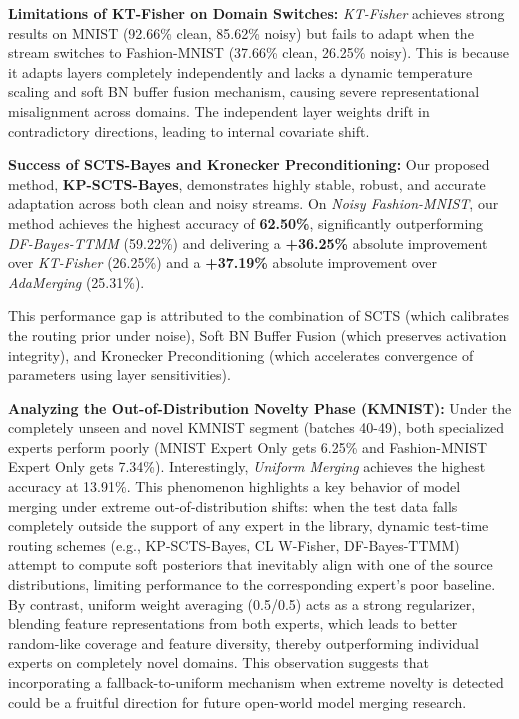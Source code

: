 \documentclass{article}
\theoremstyle{plain}
\theoremstyle{definition}
\theoremstyle{remark}
\begin{document}
\textbf{Limitations of KT-Fisher on Domain Switches:} \textit{KT-Fisher} achieves strong results on MNIST (92.66\% clean, 85.62\% noisy) but fails to adapt when the stream switches to Fashion-MNIST (37.66\% clean, 26.25\% noisy). This is because it adapts layers completely independently and lacks a dynamic temperature scaling and soft BN buffer fusion mechanism, causing severe representational misalignment across domains. The independent layer weights drift in contradictory directions, leading to internal covariate shift.

\textbf{Success of SCTS-Bayes and Kronecker Preconditioning:} Our proposed method, \textbf{KP-SCTS-Bayes}, demonstrates highly stable, robust, and accurate adaptation across both clean and noisy streams. On \textit{Noisy Fashion-MNIST}, our method achieves the highest accuracy of \textbf{62.50\%}, significantly outperforming \textit{DF-Bayes-TTMM} (59.22\%) and delivering a \textbf{+36.25\%} absolute improvement over \textit{KT-Fisher} (26.25\%) and a \textbf{+37.19\%} absolute improvement over \textit{AdaMerging} (25.31\%). 

This performance gap is attributed to the combination of SCTS (which calibrates the routing prior under noise), Soft BN Buffer Fusion (which preserves activation integrity), and Kronecker Preconditioning (which accelerates convergence of parameters using layer sensitivities).

\textbf{Analyzing the Out-of-Distribution Novelty Phase (KMNIST):} Under the completely unseen and novel KMNIST segment (batches 40-49), both specialized experts perform poorly (MNIST Expert Only gets 6.25\% and Fashion-MNIST Expert Only gets 7.34\%). Interestingly, \textit{Uniform Merging} achieves the highest accuracy at 13.91\%. This phenomenon highlights a key behavior of model merging under extreme out-of-distribution shifts: when the test data falls completely outside the support of any expert in the library, dynamic test-time routing schemes (e.g., KP-SCTS-Bayes, CL W-Fisher, DF-Bayes-TTMM) attempt to compute soft posteriors that inevitably align with one of the source distributions, limiting performance to the corresponding expert's poor baseline. By contrast, uniform weight averaging (0.5/0.5) acts as a strong regularizer, blending feature representations from both experts, which leads to better random-like coverage and feature diversity, thereby outperforming individual experts on completely novel domains. This observation suggests that incorporating a fallback-to-uniform mechanism when extreme novelty is detected could be a fruitful direction for future open-world model merging research.
\end{document}
